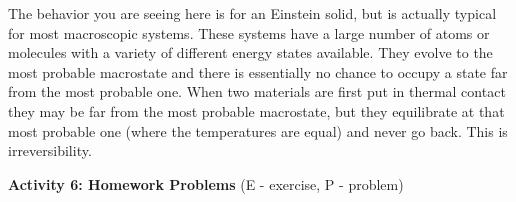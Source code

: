 The behavior you are seeing here is for an Einstein solid, but is actually typical for
most macroscopic systems. These systems have a large number of atoms or molecules
with a variety of different energy states available.
They evolve to the most probable macrostate and there is essentially no chance to occupy a state
far from the most probable one. 
When two materials are first put in thermal contact they may be far from the most probable 
macrostate, but they equilibrate at that most probable one (where the temperatures are equal)
and never go back.
This is irreversibility.



\bigskip

\textbf{Activity 6: Homework Problems} (E - exercise, P - problem)

